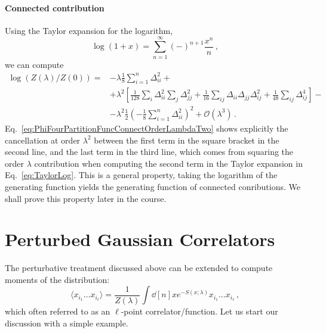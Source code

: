 \documentclass[notes.tex]{subfiles}
\begin{document}
\paragraph{Connected contribution}

Using the Taylor expansion for the logarithm,
\begin{equation}
  \label{eq:TaylorLog}
  \log(1+x) = \sum_{n=1}^\infty (-)^{n+1} \frac{x^n}{n}\, ,
\end{equation}
we can compute
\begin{align}
  \label{eq:PhiFourPartitionFuncConnectOrderLambdaTwo}
  \log\left(Z(\lambda)/Z(0)\right) = 
                    &- \lambda \frac{1}{8} \sum_{i=1}^n \Delta_{ii}^2
                                     +\nonumber \\
                     &+\lambda^2
                    \left[
                    \frac{1}{128} \sum_i \Delta_{ii}^2 \sum_j \Delta_{jj}^2 +
                    \frac{1}{16} \sum_{ij} \Delta_{ii} \Delta_{jj} \Delta_{ij}^2 +
                    \frac{1}{48} \sum_{ij} \Delta_{ij}^4
                    \right] -  \nonumber \\
  &- \lambda^2 \frac{1}{2} \left( - \frac{1}{8}
    \sum_{i=1}^n \Delta_{ii}^2\right)^2 +  \mathcal{O}(\lambda^3)\, . 
\end{align}
Eq.~\ref{eq:PhiFourPartitionFuncConnectOrderLambdaTwo} shows
explicitly the cancellation at order $\lambda^2$ between the first
term in the square bracket in the second line, and the last term in
the third line, which comes from squaring the order $\lambda$
contribution when computing the second term in the Taylor expansion in
Eq.~\ref{eq:TaylorLog}. This is a general property, taking the
logarithm of the generating function yields the generating function of
connected conributions. We shall prove this property later in the
course. 

\section{Perturbed Gaussian Correlators}
\label{sec:pert-gauss-corr}

The perturbative treatment discussed above can be extended to compute
moments of the distribution:
\begin{equation}
  \label{eq:lPointCorrPert}
  \langle x_{i_1} \ldots x_{i_\ell}\rangle =
  \frac{1}{Z(\lambda)} 
  \int \dd[n]{x} e^{-S(x;\lambda)} x_{i_1} \ldots x_{i_\ell}\, ,
\end{equation}
which often referred to as an $\ell$-point correlator/function. Let us start
our discussion with a simple example. 
\end{document}
